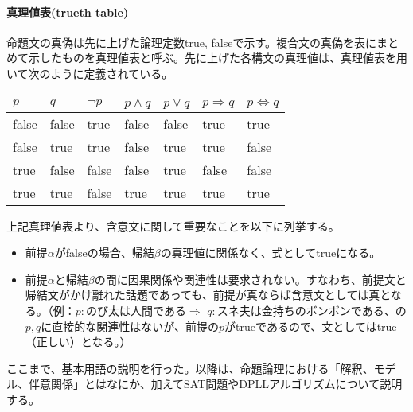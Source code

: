 \documentclass[dvipdfmx]{jsarticle}
\begin{document}
  \paragraph{真理値表(trueth table)}
  命題文の真偽は先に上げた論理定数true, falseで示す。複合文の真偽を表にまとめて示したものを真理値表と呼ぶ。先に上げた各構文の真理値は、真理値表を用いて次のように定義されている。
  \begin{table}[H]
    \centering
\begin{tabular}{|l|l||l|l|l|l|l|} \hline
  $p$   & $q$   & $\neg p$ & $p \wedge q$ & $p \vee q$ & $p \Rightarrow q$ & $p \Leftrightarrow q$ \\ \hline
  false & false & true     & false        & false      & true              & true                \\ \hline
  false & true  & true     & false        & true       & true              & false               \\ \hline
  true  & false & false    & false        & true       & false             & false               \\ \hline
  true  & true  & false    & true         & true       & true              & true \\ \hline
\end{tabular}
\end{table}
上記真理値表より、含意文に関して重要なことを以下に列挙する。
\begin{itemize}
    \item 前提$\alpha$がfalseの場合、帰結$\beta$の真理値に関係なく、式としてtrueになる。
    \item 前提$\alpha$と帰結$\beta$の間に因果関係や関連性は要求されない。すなわち、前提文と帰結文がかけ離れた話題であっても、前提が真ならば含意文としては真となる。（例：$p:$のび太は人間である$\Rightarrow$ $q:$スネ夫は金持ちのボンボンである、の$p,q$に直接的な関連性はないが、前提の$p$がtrueであるので、文としてはtrue（正しい）となる。）
\end{itemize}
ここまで、基本用語の説明を行った。以降は、命題論理における「解釈、モデル、伴意関係」とはなにか、加えてSAT問題やDPLLアルゴリズムについて説明する。
\end{document}
